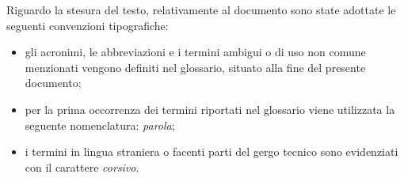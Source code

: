Riguardo la stesura del testo, relativamente al documento sono state adottate le seguenti convenzioni tipografiche:
\begin{itemize}
	\item gli acronimi, le abbreviazioni e i termini ambigui o di uso non comune menzionati vengono definiti nel glossario, situato alla fine del presente documento;
	\item per la prima occorrenza dei termini riportati nel glossario viene utilizzata la seguente nomenclatura: \textit{parola}\glox\gloxspacing;
	\item i termini in lingua straniera o facenti parti del gergo tecnico sono evidenziati con il carattere \textit{corsivo}.
\end{itemize}

\newpage